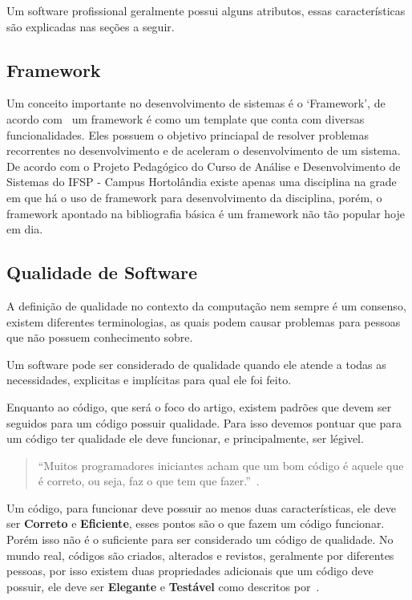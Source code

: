 \documentclass[12pt]{article}
\begin{document}
Um software profissional geralmente possui alguns atributos,
essas características são explicadas nas seções a seguir.

\subsection{Framework}

Um conceito importante no desenvolvimento de sistemas é o `Framework', de acordo com~\cite{host12} um
framework é como um template que conta com diversas funcionalidades. Eles possuem o objetivo princiapal de
resolver problemas recorrentes no desenvolvimento e de aceleram o desenvolvimento de um sistema. De
acordo com o Projeto Pedagógico do Curso de Análise e Desenvolvimento de Sistemas do IFSP - Campus Hortolândia
existe apenas uma disciplina na grade em que há o uso de framework para desenvolvimento da disciplina, porém,
o framework apontado na bibliografia básica é um framework não tão popular hoje em dia.

\subsection{Qualidade de Software}

A definição de qualidade no contexto da computação nem sempre é um consenso,
existem diferentes terminologias, as quais podem causar problemas para pessoas que não
possuem conhecimento sobre.~\cite{Duarte03}

Um software pode ser considerado de qualidade quando ele atende a todas as necessidades, explicitas
e implícitas para qual ele foi feito.~\cite{Duarte03}

Enquanto ao código, que será o foco do artigo, existem padrões que devem ser seguidos para um código
possuir qualidade. Para isso devemos pontuar que para um código ter qualidade ele deve funcionar, e principalmente,
ser légivel.

\begin{quote}
  ``Muitos programadores iniciantes acham que um bom código é aquele que é correto, ou seja, faz o que tem 
  que fazer.''~\cite{Levy04}.
\end{quote}

Um código, para funcionar deve possuir ao menos duas características, ele deve ser \textbf{Correto} e \textbf{Eficiente},
esses pontos são o que fazem um código funcionar. Porém isso não é o suficiente para ser considerado
um código de qualidade. No mundo real, códigos são criados, alterados e revistos, geralmente por diferentes pessoas,
por isso existem duas propriedades adicionais que um código deve possuir, ele deve ser \textbf{Elegante} e \textbf{Testável}
como descritos por~\cite{Levy04}.
\end{document}
